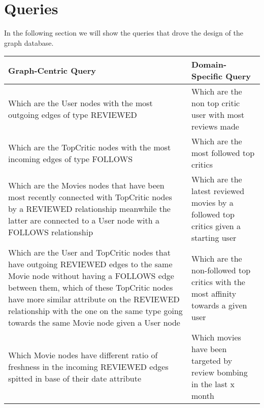 \section{Queries}
In the following section we will show the queries that drove the design of the graph database.
\begin{center}
\begin{tabular}{|p{8cm} ||p{8cm}|}
\hline
Graph-Centric Query & Domain-Specific Query \\
\hline\hline
Which are the User nodes with the most outgoing edges of type REVIEWED & Which are the non top critic user with most reviews made\\
\hline
Which are the TopCritic nodes with the most incoming edges of type FOLLOWS & Which are the most followed top critics \\
\hline
Which are the Movies nodes that have been most recently connected with TopCritic nodes by a REVIEWED relationship meanwhile the latter are connected to a User node with a FOLLOWS relationship & Which are the latest reviewed movies by a followed top critics given a starting user \\
\hline
Which are the User and TopCritic nodes that have outgoing REVIEWED edges to the same Movie node without having a FOLLOWS edge between them, which of these TopCritic nodes have more similar attribute on the REVIEWED relationship with the one on the same type going towards the same Movie node given a User node & Which are the non-followed top critics with the most affinity towards a given user\\
\hline
Which Movie nodes have different ratio of freshness in the incoming REVIEWED edges spitted in base of their date attribute & Which movies have been targeted by review bombing in the last x month\\
\hline
\end{tabular}
\end{center}
%